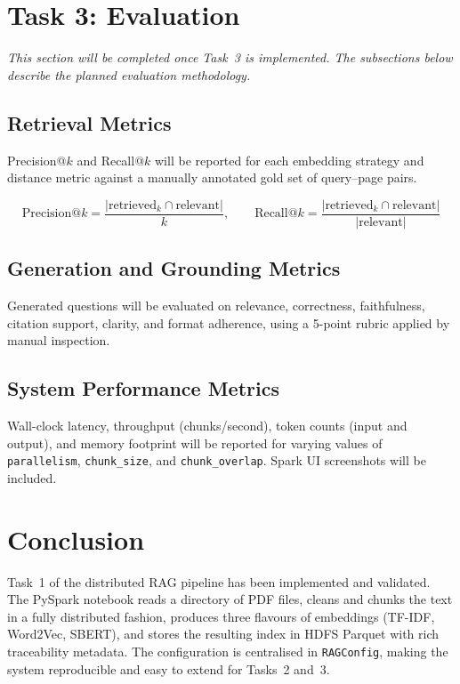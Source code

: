 \documentclass[a4paper,11pt]{article}
\begin{document}
\section{Task 3: Evaluation}
\label{sec:task3}

\textit{This section will be completed once Task~3 is implemented.
The subsections below describe the planned evaluation methodology.}

\subsection{Retrieval Metrics}

Precision@$k$ and Recall@$k$ will be reported for each embedding strategy
and distance metric against a manually annotated gold set of query–page
pairs.

\[
  \text{Precision@}k = \frac{|\text{retrieved}_{k} \cap \text{relevant}|}{k},
  \qquad
  \text{Recall@}k = \frac{|\text{retrieved}_{k} \cap \text{relevant}|}{|\text{relevant}|}
\]

\subsection{Generation and Grounding Metrics}

Generated questions will be evaluated on relevance, correctness,
faithfulness, citation support, clarity, and format adherence, using a
5-point rubric applied by manual inspection.

\subsection{System Performance Metrics}

Wall-clock latency, throughput (chunks/second), token counts (input and
output), and memory footprint will be reported for varying values of
\texttt{parallelism}, \texttt{chunk\_size}, and \texttt{chunk\_overlap}.
Spark UI screenshots will be included.

\section{Conclusion}

Task~1 of the distributed RAG pipeline has been implemented and validated.
The PySpark notebook reads a directory of PDF files, cleans and chunks the
text in a fully distributed fashion, produces three flavours of embeddings
(TF-IDF, Word2Vec, SBERT), and stores the resulting index in HDFS Parquet
with rich traceability metadata. The configuration is centralised in
\texttt{RAGConfig}, making the system reproducible and easy to extend for
Tasks~2 and~3.
\end{document}
